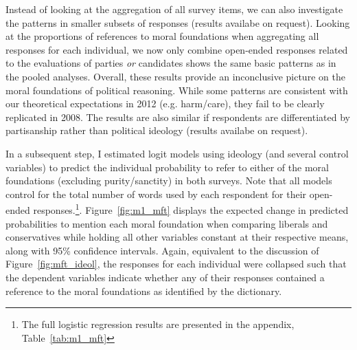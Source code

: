 \documentclass[12pt]{article}
\begin{document}
Instead of looking at the aggregation of all survey items, we can also investigate the patterns in smaller subsets of responses (results availabe on request). Looking at the proportions of references to moral foundations when aggregating all responses for each individual, we now only combine open-ended responses related to the evaluations of parties \textit{or} candidates shows the same basic patterns as in the pooled analyses. Overall, these results provide an inconclusive picture on the moral foundations of political reasoning. While some patterns are consistent with our theoretical expectations in 2012 (e.g. harm/care), they fail to be clearly replicated in 2008. The results are also similar if respondents are differentiated by partisanship rather than political ideology (results availabe on request).

In a subsequent step, I estimated logit models using ideology (and several control variables) to predict the individual probability to refer to either of the moral foundations (excluding purity/sanctity) in both surveys. Note that all models control for the total number of words used by each respondent for their open-ended responses.\footnote{The full logistic regression results are presented in the appendix, Table~\ref{tab:m1_mft}}. Figure~\ref{fig:m1_mft} displays the expected change in predicted probabilities to mention each moral foundation when comparing liberals and conservatives while holding all other variables constant at their respective means, along with 95\% confidence intervals. Again, equivalent to the discussion of Figure~\ref{fig:mft_ideol}, the responses for each individual were collapsed such that the dependent variables indicate whether any of their responses contained a reference to the moral foundations as identified by the dictionary. 
\end{document}
